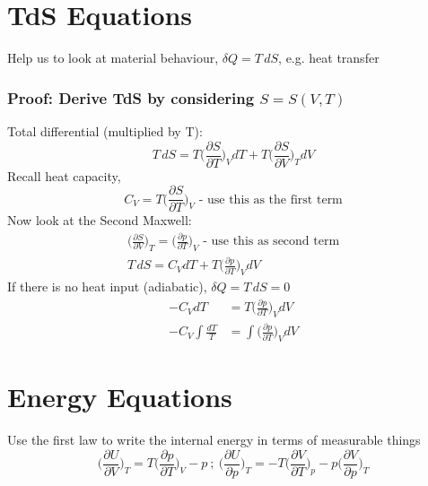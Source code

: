 \documentclass[a4paper, 11pt, normalem]{report}
\newcommand\p{\partial}
\begin{document}
\section{TdS Equations}
Help us to look at material behaviour, $\delta Q = T\,dS$, e.g. heat transfer

\subsubsection{Proof: Derive TdS by considering $S = S(V,T)$}
Total differential (multiplied by T):
\begin{equation*}
    T\,dS = T\Big(\frac{\p S}{\p T}\Big)_V dT + T\Big(\frac{\p S}{\p V}\Big)_T dV
\end{equation*}
Recall heat capacity,
\begin{equation*}
    C_V = T\Big(\frac{\p S}{\p T}\Big)_V \text{ - use this as the first term}
\end{equation*}
Now look at the Second Maxwell:
\begin{gather*}
    \Big(\frac{\p S}{\p V}\Big)_T = \Big(\frac{\p p}{\p T}\Big)_V \text{ - use this as second term} \\
    T\,dS = C_V dT + T\Big(\frac{\p p}{\p T}\Big)_V dV
\end{gather*}
If there is no heat input (adiabatic), $\delta Q = T\,dS = 0$
\begin{align*}
    -C_V dT &= T\Big(\frac{\p p}{\p T}\Big)_V dV \\
    -C_V \int \frac{dT}{T} &= \int \Big(\frac{\p p}{\p T}\Big)_V dV
\end{align*}

\section{Energy Equations}
Use the first law to write the internal energy in terms of measurable things
\begin{equation*}
    \Big(\frac{\p U}{\p V}\Big)_T = T\Big(\frac{\p p}{\p T}\Big)_V - p ~;~ \Big(\frac{\p U}{\p p}\Big)_T = -T\Big(\frac{\p V}{\p T}\Big)_p - p\Big(\frac{\p V}{\p p}\Big)_T
\end{equation*}
\end{document}
